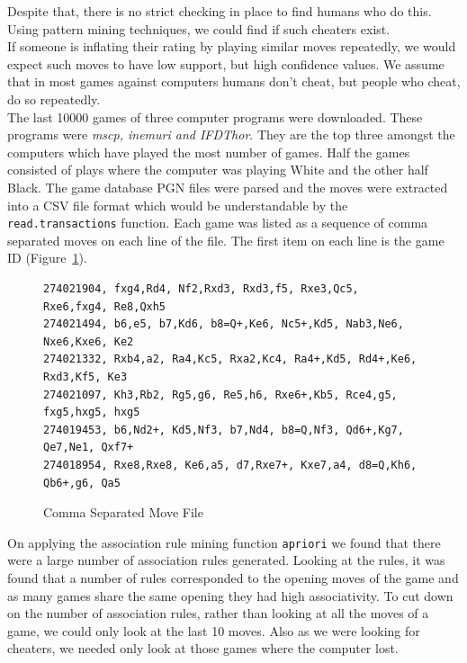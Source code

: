 \documentclass{article}
\begin{document}
Despite that, there is no strict checking in place to find humans who do this. Using pattern mining techniques, we could find if such cheaters exist.\\

If someone is inflating their rating by playing similar moves repeatedly, we would expect such moves to have low support, but  high confidence values. We assume that in most games against computers humans don't cheat, but people who cheat, do so repeatedly. \\

The last 10000 games of three computer programs were downloaded. These programs were {\sl mscp, inemuri and IFDThor}. They are the top three amongst the computers which have played the most number of games. Half the games consisted of plays where the computer was playing White and the other half Black. The game database PGN files were parsed and the moves were extracted into a CSV file format which would be understandable by the \verb=read.transactions= function. Each game was listed as a sequence of comma separated moves on each line of the file. The first item on each line is the game ID (Figure~\ref{fig:movecsv}).\\

\begin{figure}

\begin{verbatim}
274021904, fxg4,Rd4, Nf2,Rxd3, Rxd3,f5, Rxe3,Qc5, Rxe6,fxg4, Re8,Qxh5
274021494, b6,e5, b7,Kd6, b8=Q+,Ke6, Nc5+,Kd5, Nab3,Ne6, Nxe6,Kxe6, Ke2
274021332, Rxb4,a2, Ra4,Kc5, Rxa2,Kc4, Ra4+,Kd5, Rd4+,Ke6, Rxd3,Kf5, Ke3
274021097, Kh3,Rb2, Rg5,g6, Re5,h6, Rxe6+,Kb5, Rce4,g5, fxg5,hxg5, hxg5
274019453, b6,Nd2+, Kd5,Nf3, b7,Nd4, b8=Q,Nf3, Qd6+,Kg7, Qe7,Ne1, Qxf7+
274018954, Rxe8,Rxe8, Ke6,a5, d7,Rxe7+, Kxe7,a4, d8=Q,Kh6, Qb6+,g6, Qa5
\end{verbatim}
\caption{Comma Separated Move File}
\label{fig:movecsv}
\end{figure}


On applying the association rule mining function \verb=apriori= we found that there were a large number of association rules generated. Looking at the rules, it was found that a number of rules corresponded to the opening moves of the game and as many games share the same opening they had high associativity. To cut down on the number of association rules, rather than looking at all the moves of a game, we could only look at the last 10 moves. Also as we were looking for cheaters, we needed only look at those games where the computer lost.\\
\end{document}
